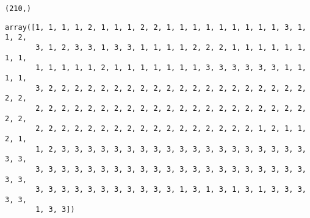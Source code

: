 \documentclass[11pt]{article}
\begin{document}
    
    
    \begin{verbatim}
(210,)
    \end{verbatim}

    
    
    \begin{verbatim}
array([1, 1, 1, 1, 2, 1, 1, 1, 2, 2, 1, 1, 1, 1, 1, 1, 1, 1, 1, 3, 1, 1, 2,
       3, 1, 2, 3, 3, 1, 3, 3, 1, 1, 1, 1, 2, 2, 2, 1, 1, 1, 1, 1, 1, 1, 1,
       1, 1, 1, 1, 1, 2, 1, 1, 1, 1, 1, 1, 1, 3, 3, 3, 3, 3, 3, 1, 1, 1, 1,
       3, 2, 2, 2, 2, 2, 2, 2, 2, 2, 2, 2, 2, 2, 2, 2, 2, 2, 2, 2, 2, 2, 2,
       2, 2, 2, 2, 2, 2, 2, 2, 2, 2, 2, 2, 2, 2, 2, 2, 2, 2, 2, 2, 2, 2, 2,
       2, 2, 2, 2, 2, 2, 2, 2, 2, 2, 2, 2, 2, 2, 2, 2, 2, 1, 2, 1, 1, 2, 1,
       1, 2, 3, 3, 3, 3, 3, 3, 3, 3, 3, 3, 3, 3, 3, 3, 3, 3, 3, 3, 3, 3, 3,
       3, 3, 3, 3, 3, 3, 3, 3, 3, 3, 3, 3, 3, 3, 3, 3, 3, 3, 3, 3, 3, 3, 3,
       3, 3, 3, 3, 3, 3, 3, 3, 3, 3, 3, 1, 3, 1, 3, 1, 3, 1, 3, 3, 3, 3, 3,
       1, 3, 3])
    \end{verbatim}
\end{document}
